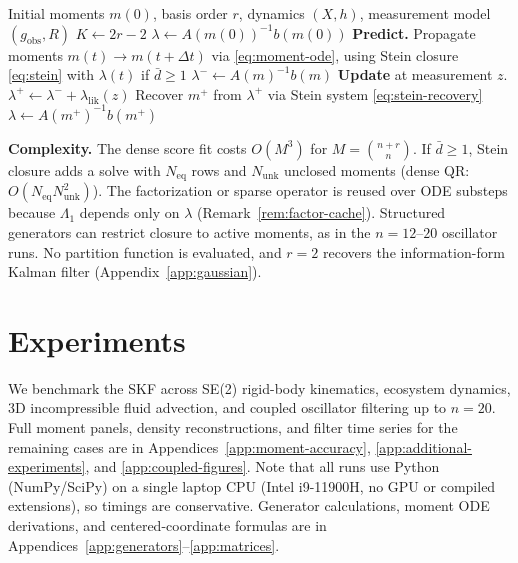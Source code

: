 \documentclass{article}
\theoremstyle{definition}
\begin{document}
\begin{algorithm}[t]
\caption{Score Kalman Filter (polynomial MED, degree $r$)}
\label{alg:skf}
\begin{algorithmic}[1]
\REQUIRE Initial moments $m(0)$, basis order $r$, dynamics $(X, h)$, measurement model $(g_{\mathrm{obs}}, R)$
\STATE $K \gets 2r - 2$ \hfill{}
\STATE $\lambda \gets A(m(0))^{-1}b(m(0))$ \hfill{}
    \STATE \textbf{Predict.}
    \STATE \quad Propagate moments $m(t) \to m(t{+}\Delta t)$ via \eqref{eq:moment-ode},
    using Stein closure \eqref{eq:stein} with $\lambda(t)$ if $\bar{d} \ge 1$
    \STATE \quad $\lambda^- \gets A(m)^{-1}b(m)$ \hfill{}
    \STATE \textbf{Update} at measurement $z$.
    \STATE \quad $\lambda^+ \gets \lambda^- + \lambda_{\mathrm{lik}}(z)$ \hfill{}
    \STATE \quad Recover $m^+$ from $\lambda^+$ via Stein system \eqref{eq:stein-recovery}
    \hfill{}
    \STATE \quad $\lambda \gets A(m^+)^{-1}b(m^+)$ \hfill{}
\ENDFOR
\end{algorithmic}
\end{algorithm}

\textbf{Complexity.} The dense score fit costs $O(M^3)$ for
$M=\binom{n+r}{n}$. If $\bar d\ge 1$, Stein closure adds a solve with
$N_{\mathrm{eq}}$ rows and $N_{\mathrm{unk}}$ unclosed moments
(dense QR: $O(N_{\mathrm{eq}}N_{\mathrm{unk}}^2)$). The factorization or
sparse operator is reused over ODE substeps because $\Lambda_1$ depends
only on $\lambda$ (Remark~\ref{rem:factor-cache}). Structured generators
can restrict closure to active moments, as in the $n=12$--$20$ oscillator
runs. No partition function is evaluated, and $r=2$ recovers the
information-form Kalman filter (Appendix~\ref{app:gaussian}).

\section{Experiments}
\label{sec:experiments}

We benchmark the SKF across SE(2) rigid-body kinematics,
ecosystem dynamics, 3D incompressible fluid advection, and coupled
oscillator filtering up to $n{=}20$. Full moment panels, density
reconstructions, and filter time series for the remaining cases are in
Appendices~\ref{app:moment-accuracy},
\ref{app:additional-experiments}, and \ref{app:coupled-figures}.
Note that all runs use Python (NumPy/SciPy) on a single laptop CPU
(Intel i9-11900H, no GPU or compiled extensions), so timings are
conservative. Generator calculations, moment ODE derivations, and
centered-coordinate formulas are in
Appendices~\ref{app:generators}--\ref{app:matrices}.
\end{document}
